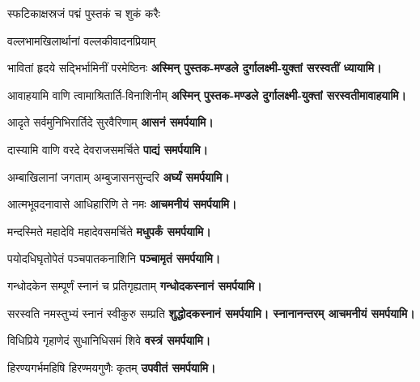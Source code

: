 \begin{center}

{स्फटिकाक्षस्रजं पद्मं पुस्तकं च शुकं करैः}

{वल्लभामखिलार्थानां वल्लकीवादनप्रियाम्}

{भावितां हृदये सद्भिर्भामिनीं परमेष्ठिनः}
\textbf{अस्मिन् पुस्तक-मण्डले दुर्गालक्ष्मी-युक्तां सरस्वतीं ध्यायामि।}
\medskip

{आवाहयामि वाणि त्वामाश्रितार्ति-विनाशिनीम्}
\textbf{अस्मिन् पुस्तक-मण्डले दुर्गालक्ष्मी-युक्तां सरस्वतीमावाहयामि।}
\medskip

{आदृते सर्वमुनिभिरार्तिदे सुरवैरिणाम् }
\textbf{\devAya{} आसनं समर्पयामि।}
\medskip

{दास्यामि वाणि वरदे देवराजसमर्चिते}
\textbf{\devAya{} पाद्यं समर्पयामि।}
\medskip

{अम्बाखिलानां जगताम् अम्बुजासनसुन्दरि}
\textbf{\devAya{} अर्घ्यं समर्पयामि।}
\medskip

{आत्मभूवदनावासे आधिहारिणि ते नमः}
\textbf{\devAya{} आचमनीयं समर्पयामि।}
\medskip

{मन्दस्मिते महादेवि महादेवसमर्चिते}
\textbf{\devAya{} मधुपर्कं समर्पयामि।}
\medskip

{पयोदधिघृतोपेतं पञ्चपातकनाशिनि}
\textbf{\devAya{} पञ्चामृतं समर्पयामि।}
\medskip

{गन्धोदकेन सम्पूर्णं स्नानं च प्रतिगृह्यताम्}
\textbf{\devAya{} गन्धोदकस्नानं समर्पयामि।}\footnotemark
\medskip

{सरस्वति नमस्तुभ्यं स्नानं स्वीकुरु सम्प्रति}
\textbf{\devAya{} शुद्धोदकस्नानं समर्पयामि। स्नानानन्तरम् आचमनीयं समर्पयामि।}
\medskip

{विधिप्रिये गृहाणेदं सुधानिधिसमं शिवे}
\textbf{\devAya{} वस्त्रं समर्पयामि।}
\medskip

{हिरण्यगर्भमहिषि हिरण्मयगुणैः कृतम्}
\textbf{\devAya{} उपवीतं समर्पयामि।}
\medskip


\end{center}
